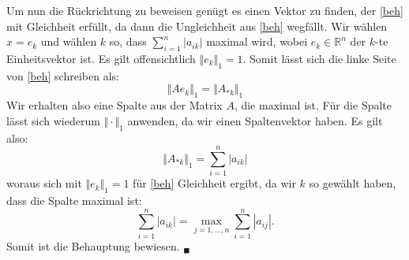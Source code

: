 \documentclass[11pt]{article}
\theoremstyle{plain}
\theoremstyle{definition}
\renewcommand{\a}{\"{a}}
\renewcommand{\u}{\"{u}}
\begin{document}
Um nun die R\u ckrichtung zu beweisen gen\u gt es einen Vektor zu finden, der \eqref{beh} mit Gleichheit erf\u llt, da dann die Ungleichheit aus \eqref{beh} wegf\a llt. Wir w\a hlen $x=e_k$ und w\a hlen $k$ so, dass $\sum_{i=1}^n |a_{ik}|$ maximal wird, wobei $e_k \in \mathbb{R}^n$ der $k$-te Einheitsvektor ist. Es gilt offensichtlich $\Vert e_k \Vert_1 = 1$. Somit l\a sst sich die linke Seite von \eqref{beh} schreiben als:
\begin{equation}
\Vert Ae_k \Vert_1 = \Vert A_{*k} \Vert_1
\end{equation}
Wir erhalten also eine Spalte aus der Matrix $A$, die maximal ist. F\u r die Spalte l\a sst sich wiederum $\Vert\cdot\Vert_1$ anwenden, da wir einen Spaltenvektor haben. Es gilt also:
\begin{equation}
\Vert A_{*k} \Vert_1 = \sum_{i=1}^n |a_{ik}|
\end{equation}
woraus sich mit $\Vert e_k\Vert_1 = 1$ f\u r \eqref{beh} Gleichheit ergibt, da wir $k$ so gew\a hlt haben, dass die Spalte maximal ist:
\begin{equation}
\sum_{i=1}^n |a_{ik}| = \max_{j=1,...,n} \sum_{i=1}^n |a_{ij}|.
\end{equation}
Somit ist die Behauptung bewiesen. $_\blacksquare$
\end{document}
